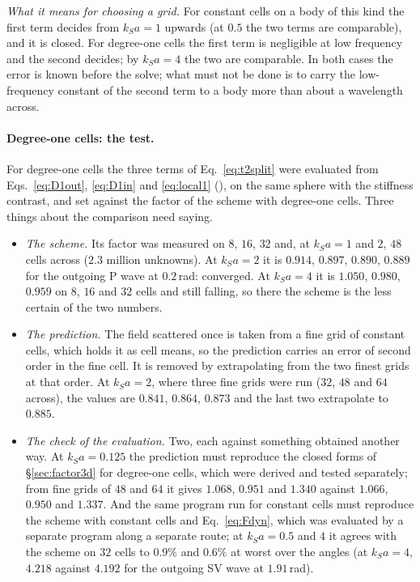 \documentclass[11pt,a4paper]{article}
\begin{document}
\emph{What it means for choosing a grid.} For constant cells on a body of this kind the first term
decides from $k_Sa=1$ upwards (at $0.5$ the two terms are comparable), and it is closed. For degree-one cells the first term is negligible
at low frequency and the second decides; by $k_Sa=4$ the two are comparable. In both cases the error is
known before the solve; what must not be done is to carry the low-frequency constant of the second term
to a body more than about a wavelength across.

\paragraph{Degree-one cells: the test.} For degree-one cells the three terms of Eq.~\eqref{eq:t2split}
were evaluated from Eqs.~\eqref{eq:D1out}, \eqref{eq:D1in} and \eqref{eq:local1}
(), on the same sphere with the stiffness contrast, and set
against the factor of the scheme with degree-one cells. Three things about the comparison need saying.
\begin{itemize}
\item \emph{The scheme.} Its factor was measured on $8$, $16$, $32$ and, at $k_Sa=1$ and $2$, $48$ cells
across ($2.3$ million unknowns). At $k_Sa=2$ it is $0.914$, $0.897$, $0.890$, $0.889$ for the outgoing P
wave at $0.2$\,rad: converged. At $k_Sa=4$ it is $1.050$, $0.980$, $0.959$ on $8$, $16$ and $32$ cells and
still falling, so there the scheme is the less certain of the two numbers.
\item \emph{The prediction.} The field scattered once is taken from a fine grid of constant cells, which
holds it as cell means, so the prediction carries an error of second order in the fine cell. It is
removed by extrapolating from the two finest grids at that order. At $k_Sa=2$, where three fine grids
were run ($32$, $48$ and $64$ across), the values are $0.841$, $0.864$, $0.873$ and the last two
extrapolate to $0.885$.
\item \emph{The check of the evaluation.} Two, each against something obtained another way. At
$k_Sa=0.125$ the prediction must reproduce the closed forms of \S\ref{sec:factor3d} for degree-one cells,
which were derived and tested separately; from fine grids of $48$ and $64$ it gives $1.068$, $0.951$ and
$1.340$ against $1.066$, $0.950$ and $1.337$. And the same program run for constant cells must reproduce
the scheme with constant cells and Eq.~\eqref{eq:Fdyn}, which was evaluated by a separate program along a
separate route; at $k_Sa=0.5$ and $4$ it agrees with the scheme on $32$ cells to $0.9\%$ and $0.6\%$ at
worst over the angles (at $k_Sa=4$, $4.218$ against $4.192$ for the outgoing SV wave at $1.91$\,rad).
\end{itemize}
\end{document}
